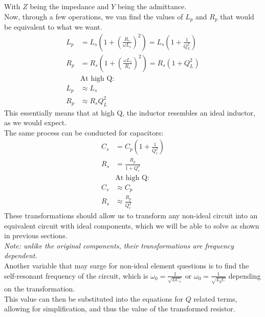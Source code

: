 \documentclass[nobib]{tufte-handout}
\begin{document}
With $Z$ being the impedance and $Y$ being the admittance.\\
Now, through a few operations, we van find the values of $L_p$ and $R_p$ that would be equivalent to what we want.\\
\begin{align*}
    L_p & =L_s\left(1+\left(\frac{R_s}{\omega L_s}\right)^2\right)=L_s\left(1+\frac{1}{Q_L^2}\right) \\
    R_p & =R_s\left(1+\left(\frac{\omega L_s}{R_s}\right)^2\right)=R_s(1+Q_L^2)                      \\
        & \text{At high Q:}                                                                          \\
    L_p & \approx L_s                                                                                \\
    R_p & \approx R_s Q_L^2
\end{align*}
This essentially means that at high Q, the inductor resembles an ideal inductor, as we would expect.\\
The same process can be conducted for capacitors:\\
\begin{align*}
    C_s & = C_p\left(1+\frac{1}{Q_c^2}\right) \\
    R_s & = \frac{R_p}{1+Q_c^2}               \\
        & \text{At high Q:}                   \\
    C_s & \approx C_p                         \\
    R_s & \approx \frac{R_p}{Q_c^2}
\end{align*}
These transformations should allow us to transform any non-ideal circuit into an equivalent circuit with ideal components, which we will be able to solve as shown in previous sections.\\
\textit{Note: unlike the original components, their transformations are frequency dependent.}\\
Another variable that may surge for non-ideal element questions is to find the self-resonant frequency of the circuit, which is $\omega_0=\frac{1}{\sqrt{LC_s}}$ or $\omega_0=\frac{1}{\sqrt{L_p C}}$ depending on the transformation.\\
This value can then be substituted into the equations for $Q$ related terms, allowing for simplification, and thus the value of the transformed resistor.
\end{document}
